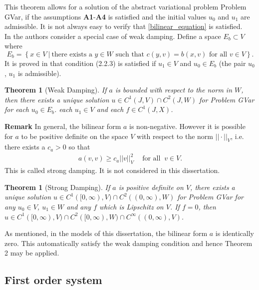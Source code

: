 \documentclass[../../main.tex]{subfiles}
\begin{document}
This theorem allows for a solution of the abstract variational problem Problem GVar, if the assumptions \textbf{A1}-\textbf{A4} is satisfied and the initial values $u_0$ and $u_1$ are admissible. It is not always easy to verify that \eqref{bilinear_equation} is satisfied.\\


In \cite{VV02} the authors consider a special case of weak damping. Define a space $E_b \subset V$ where \[ E_b = \left\{x \in V \ | \ \textrm{there exists a } y \in W \textrm{ such that } c(y,v) = b(x,v) \textrm{ for all } v \in V\right\}.\] It is proved in \cite{VV02}  that condition (2.2.3) is satisfied if $u_1 \in V$ and $u_0 \in E_b$ (the pair $u_0$, $u_1$ is admissible).


\newtheorem{Thm2n}[Thmx]{Theorem}
\begin{Thm2n}[Weak Damping]
	If $a$ is bounded with respect to the norm in $W$, then there exists a unique solution $u\in C^1(J,V)\cap C^2(J,W)$ for Problem GVar for each $u_0 \in E_b$. each $u_1 \in V$ and each $f\in C^1(J,X)$.
\end{Thm2n}

\textbf{Remark} In general, the bilinear form $a$ is non-negative. However it is possible for $a$ to be positive definite on the space $V$ with respect to the norm $||\cdot||_V$, i.e. there exists a $c_a > 0$ so that
\begin{eqnarray*}
	a(v,v) \geq c_a ||v||^2_V \ \ \ \ \textrm{ for all } \ v \in V.
\end{eqnarray*} This is called strong damping. It is not considered in this dissertation.

\newtheorem{Thm3n}[Thmx]{Theorem}
\begin{Thm3n}[Strong Damping]
	If $a$ is positive definite on $V$, there exists a unique solution $u \in C^1([0,\infty),V)\cap C^2((0,\infty),W)$ for Problem GVar for any $u_0 \in V$, $u_1 \in W$ and any $f$ which is Lipschitz on $V$. If $f=0$, then $u \in C^1([0,\infty),V)\cap C^2([0,\infty),W)\cap C^\infty((0,\infty),V)$.
\end{Thm3n}

As mentioned, in the models of this dissertation, the bilinear form $a$ is identically zero. This automatically satisfy the weak damping condition and hence Theorem 2 may be applied.


\subsection{First order system} \label{ssec:existence:AbstractDifferentialEquation}
\end{document}
